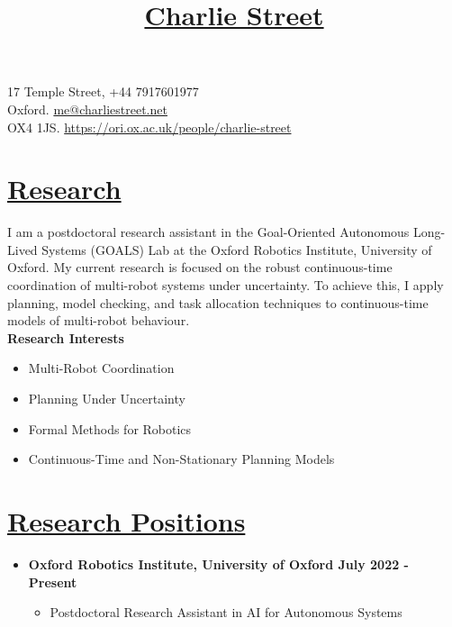 \documentclass[11pt]{article}
\title{\vspace{-70pt}\Huge\underline{Charlie Street}}
\date{}
\begin{document}
\maketitle
\vspace*{-60pt}

\begin{flushleft}
\noindent
\large 17 Temple Street,
\hfill 
\large +44 7917601977 \\
\large Oxford. 
\hfill
\large
\large \href{mailto:me@charliestreet.net}{\url{me@charliestreet.net}} \\
\large OX4 1JS.
\hfill
\large
\url{https://ori.ox.ac.uk/people/charlie-street} \\
\end{flushleft}
	
\section*{\uline{Research}}	
        
I am a postdoctoral research assistant in the Goal-Oriented Autonomous Long-Lived Systems (GOALS) Lab at the Oxford Robotics Institute, University of Oxford.
%
My current research is focused on the robust continuous-time coordination of multi-robot systems under uncertainty.
%
To achieve this, I apply planning, model checking, and task allocation techniques to continuous-time models of multi-robot behaviour.\\

\noindent \textbf{Research Interests}
\begin{itemize}
    \item Multi-Robot Coordination
    \item Planning Under Uncertainty
    \item Formal Methods for Robotics 
    \item Continuous-Time and Non-Stationary Planning Models
\end{itemize}

\section*{\uline{Research Positions}}
\begin{itemize}
\item \textbf{Oxford Robotics Institute, University of Oxford \hfill July 2022 - Present} 
\begin{itemize}
    \item Postdoctoral Research Assistant in AI for Autonomous Systems
\end{itemize}
\end{itemize}
	
\end{document}
